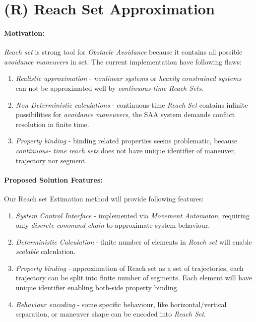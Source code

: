 \newpage
\section{(R) Reach Set Approximation}\label{s:reachSet}

    \noindent\paragraph{Motivation:} \emph{Reach set} is strong tool for \emph{Obstacle Avoidance} because it contains all possible \emph{avoidance maneuvers} in set. The current implementation have following flaws:
    
    \begin{enumerate}
        \item \emph{Realistic approximation} - \emph{nonlinear systems} or \emph{heavily constrained systems} can not be approximated well by \emph{continuous-time Reach Sets}.
        
        \item \emph{Non Deterministic calculations} - continuous-time \emph{Reach Set} contains  infinite possibilities for \emph{avoidance maneuvers}, the SAA system demands conflict resolution in finite time.
        
        \item \emph{Property binding} - binding related properties seems problematic, because \emph{continuous- time reach sets} does not have unique identifier of maneuver, trajectory nor segment. 
    \end{enumerate}
    
    \paragraph{Proposed Solution Features:} Our Reach set Estimation method will provide following features:
    
    \begin{enumerate}
        \item \emph{System Control Interface} - implemented via \emph{Movement Automaton}, requiring only \emph{discrete command chain} to approximate system behaviour.
        
        \item \emph{Deterministic Calculation} - finite number of elements in \emph{Reach set} will enable \emph{scalable} calculation.
        
        \item \emph{Property binding} - approximation of Reach set as a set of trajectories, each trajectory can be split into finite number of segments. Each element will have unique identifier enabling both-side  property binding.
        
        \item \emph{Behaviour encoding} - some specific behaviour, like horizontal/vertical separation, or maneuver shape can be encoded into \emph{Reach Set}.
    \end{enumerate}
    

